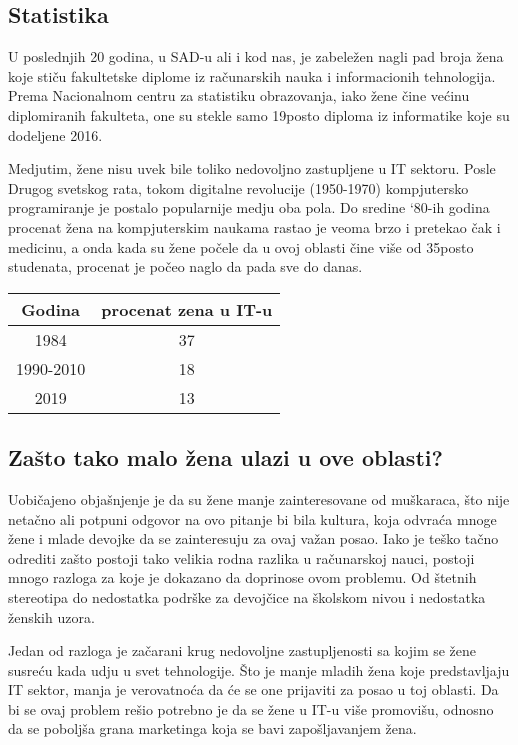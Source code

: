 \documentclass[a4paper,12pt]{article}
\begin{document}
\subsection{Statistika}

U poslednjih 20 godina, u SAD-u ali i kod nas, je zabeležen nagli pad broja žena koje stiču fakultetske diplome iz računarskih nauka i
informacionih tehnologija. Prema Nacionalnom centru za statistiku obrazovanja, iako žene čine većinu diplomiranih fakulteta, 
one su stekle samo 19posto diploma iz informatike koje su dodeljene 2016.

Medjutim, žene nisu uvek bile toliko nedovoljno zastupljene u IT sektoru. Posle Drugog svetskog rata, 
tokom digitalne revolucije (1950-1970) kompjutersko programiranje je postalo popularnije medju oba pola. 
Do sredine `80-ih godina procenat žena na kompjuterskim naukama rastao je veoma brzo i pretekao čak i medicinu, 
a onda kada su žene počele da u ovoj oblasti čine više od 35posto studenata, procenat je počeo naglo da pada sve do danas. 

\begin{table}[h]
\centering
\begin{tabular}{c|c}
\toprule
Godina    & procenat zena u IT-u \\ 
\midrule
1984      & 37                   \\ 
1990-2010 & 18                   \\ 
2019      & 13                   \\ 
\bottomrule
\end{tabular}
\end{table}



\subsection{Zašto tako malo žena ulazi u ove oblasti? }
Uobičajeno objašnjenje je da su žene manje zainteresovane od muškaraca, 
što nije netačno ali potpuni odgovor na ovo pitanje bi bila kultura, 
koja odvraća mnoge žene i mlade devojke da se zainteresuju za ovaj važan posao.
Iako je teško tačno odrediti zašto postoji tako velikia rodna razlika u računarskoj nauci, 
postoji mnogo razloga za koje je dokazano da doprinose ovom problemu. 
Od štetnih stereotipa do nedostatka podrške za devojčice na školskom nivou i nedostatka ženskih uzora.

Jedan od razloga je začarani krug nedovoljne zastupljenosti sa kojim se žene susreću kada udju u svet tehnologije. 
Što je manje mladih žena koje predstavljaju IT sektor, manja je verovatnoća da će se one prijaviti za posao u toj oblasti. 
Da bi se ovaj problem rešio potrebno je da se žene u IT-u više promovišu, 
odnosno da se poboljša grana marketinga koja se bavi zapošljavanjem žena.
\end{document}
